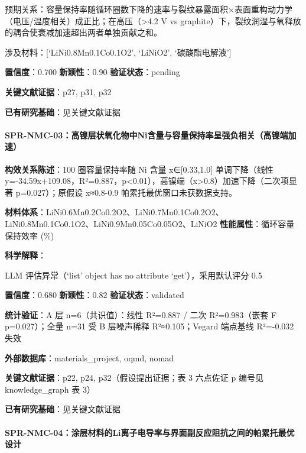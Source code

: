 \documentclass[12pt,a4paper]{ctexart}
\begin{document}
预期关系：容量保持率随循环圈数下降的速率与裂纹暴露面积×表面重构动力学（电压/温度相关）成正比；在高压（\textgreater4.2 V vs graphite）下，裂纹润湿与氧释放的耦合使衰减加速超出两者单独贡献之和。

涉及材料：{[}`LiNi0.8Mn0.1Co0.1O2', `LiNiO2', `碳酸酯电解液'{]}

\textbf{置信度}：0.700 \textbar{} \textbf{新颖性}：0.90 \textbar{} \textbf{验证状态}：pending

\textbf{关键文献证据}：p27, p31, p32

\textbf{已有研究基础}：见关键文献证据

\paragraph{SPR-NMC-03：高镍层状氧化物中Ni含量与容量保持率呈强负相关（高镍端加速）}\label{spr-nmc-03ux9ad8ux954dux5c42ux72b6ux6c27ux5316ux7269ux4e2dniux542bux91cfux4e0eux5bb9ux91cfux4fddux6301ux7387ux5448ux5f3aux8d1fux76f8ux5173ux9ad8ux954dux7aefux52a0ux901f}

\textbf{构效关系陈述}：100 圈容量保持率随 Ni 含量 x∈{[}0.33,1.0{]} 单调下降（线性 y=-34.59x+109.08，R²=0.887，p\textless0.01），高镍端（x\textgreater0.8）加速下降（二次项显著 p=0.027）；原假设 x≈0.8-0.9 帕累托最优窗口未获数据支持。

\textbf{材料体系}：LiNi0.6Mn0.2Co0.2O2、LiNi0.7Mn0.1Co0.2O2、LiNi0.8Mn0.1Co0.1O2、LiNi0.9Mn0.05Co0.05O2、LiNiO2 \textbar{} \textbf{性能属性}：循环容量保持效率 (\%)

\textbf{科学解释}：

LLM 评估异常（`list' object has no attribute `get'），采用默认评分 0.5

\textbf{置信度}：0.680 \textbar{} \textbf{新颖性}：0.82 \textbar{} \textbf{验证状态}：validated

\textbf{统计验证}：A 层 n=6（共识值）：线性 R²=0.887 / 二次 R²=0.983（嵌套 F p=0.027）；全量 n=31 受 B 层噪声稀释 R²≈0.105；Vegard 端点基线 R²=-0.032 失效

\textbf{外部数据库}：materials\_project, oqmd, nomad

\textbf{关键文献证据}：p22, p24, p32（假设提出证据；表 3 六点佐证 p 编号见 knowledge\_graph 表 3）

\textbf{已有研究基础}：见关键文献证据

\paragraph{SPR-NMC-04：涂层材料的Li离子电导率与界面副反应阻抗之间的帕累托最优设计}\label{spr-nmc-04ux6d82ux5c42ux6750ux6599ux7684liux79bbux5b50ux7535ux5bfcux7387ux4e0eux754cux9762ux526fux53cdux5e94ux963bux6297ux4e4bux95f4ux7684ux5e15ux7d2fux6258ux6700ux4f18ux8bbeux8ba1}
\end{document}

